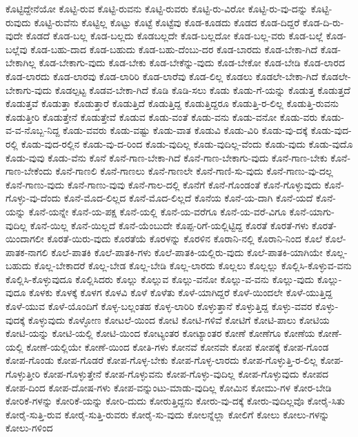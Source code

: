 {ಕೊಟ್ಟಿದ್ದೇನೆಯೋ
ಕೊಟ್ಟಿ-ರುವ
ಕೊಟ್ಟಿ-ರುವನು
ಕೊಟ್ಟಿ-ರುವರು
ಕೊಟ್ಟಿ-ರು-ವಿರೋ
ಕೊಟ್ಟಿ-ರು-ವು-ದನ್ನು
ಕೊಟ್ಟಿ-ರುವುದು
ಕೊಟ್ಟಿ-ರುವೆನು
ಕೊಟ್ಟಿಲ್ಲ
ಕೊಟ್ಟು
ಕೊಟ್ಟೆ
ಕೊಟ್ಟೆವು
ಕೊಡ-ಕೂಡದು
ಕೊಡದ
ಕೊಡ-ದಿದ್ದರೆ
ಕೊಡ-ದಿ-ರು-ವುದೇ
ಕೊಡದೆ
ಕೊಡ-ಬಲ್ಲ
ಕೊಡ-ಬಲ್ಲದು
ಕೊಡಬಲ್ಲದೇ
ಕೊಡ-ಬಲ್ಲದೋ
ಕೊಡ-ಬಲ್ಲ-ವರು
ಕೊಡ-ಬಲ್ಲೆ
ಕೊಡ-ಬಲ್ಲೆವು
ಕೊಡ-ಬಹು-ದಾದ
ಕೊಡ-ಬಹುದು
ಕೊಡ-ಬಹು-ದೆಂಬು-ದರ
ಕೊಡ-ಬಾರದು
ಕೊಡ-ಬೇಕಾ-ಗಿದೆ
ಕೊಡ-ಬೇಕಾಗಿಲ್ಲ
ಕೊಡ-ಬೇಕಾಗು-ವುದು
ಕೊಡ-ಬೇಕು
ಕೊಡ-ಬೇಕೆನ್ನು-ವುದು
ಕೊಡ-ಬೇಕೋ
ಕೊಡ-ಬೇಡಿ
ಕೊಡ-ಲಾರದ
ಕೊಡ-ಲಾರದು
ಕೊಡ-ಲಾರವು
ಕೊಡ-ಲಾರಿರಿ
ಕೊಡ-ಲಾರೆವು
ಕೊಡ-ಲಿಲ್ಲ
ಕೊಡಲು
ಕೊಡಲೇ-ಬೇಕಾ-ಗಿದೆ
ಕೊಡಲೇ-ಬೇಕಾಗು-ವುದು
ಕೊಡಲ್ಪಟ್ಟ
ಕೊಡವ-ಬೇಕಾ-ಗಿದೆ
ಕೊಡಿ
ಕೊಡಿ-ಸಲು
ಕೊಡು
ಕೊಡು-ಗೆ-ಯನ್ನು
ಕೊಡುತ್ತ
ಕೊಡುತ್ತದೆ
ಕೊಡುತ್ತವೆ
ಕೊಡುತ್ತಾ
ಕೊಡುತ್ತಾರೆ
ಕೊಡುತ್ತಿದೆ
ಕೊಡುತ್ತಿದ್ದ
ಕೊಡುತ್ತಿದ್ದರೂ
ಕೊಡುತ್ತಿ-ರ-ಲಿಲ್ಲ
ಕೊಡುತ್ತಿ-ರುವನು
ಕೊಡುತ್ತೀರಿ
ಕೊಡುತ್ತೇನೆ
ಕೊಡುತ್ತೇವೆ
ಕೊಡುವ
ಕೊಡು-ವಂತೆ
ಕೊಡು-ವನು
ಕೊಡು-ವನೋ
ಕೊಡು-ವರು
ಕೊಡು-ವ-ವ-ನೊಬ್ಬ-ನಿದ್ದ
ಕೊಡು-ವವರು
ಕೊಡು-ವಷ್ಟು
ಕೊಡು-ವಾತ
ಕೊಡುವಿ
ಕೊಡು-ವಿರಿ
ಕೊಡು-ವು-ದಕ್ಕೆ
ಕೊಡು-ವುದ-ರಲ್ಲಿ
ಕೊಡು-ವುದ-ರಲ್ಲಿನ
ಕೊಡು-ವು-ದ-ರಿಂದ
ಕೊಡು-ವುದಿಲ್ಲ
ಕೊಡು-ವುದಿಲ್ಲ-ವೆಂದು
ಕೊಡು-ವುದು
ಕೊಡು-ವುದೊ
ಕೊಡು-ವುವು
ಕೊಡು-ವೆನು
ಕೊನೆ
ಕೊನೆ-ಗಾಣ-ಬೇಕಾ-ಗಿದೆ
ಕೊನೆ-ಗಾಣ-ಬೇಕಾಗು-ವುದು
ಕೊನೆ-ಗಾಣ-ಬೇಕು
ಕೊನೆ-ಗಾಣ-ಬೇಕೆಂದು
ಕೊನೆ-ಗಾಣಲಿ
ಕೊನೆ-ಗಾಣಲು
ಕೊನೆ-ಗಾಣಲೇ
ಕೊನೆ-ಗಾಣಿ-ಸು-ವುದು
ಕೊನೆ-ಗಾಣು-ವು-ದಲ್ಲ
ಕೊನೆ-ಗಾಣು-ವುದು
ಕೊನೆ-ಗಾಣು-ವುವು
ಕೊನೆ-ಗಾಲ-ದಲ್ಲಿ
ಕೊನೆಗೆ
ಕೊನೆ-ಗೊಂಡಂತೆ
ಕೊನೆ-ಗೊಳ್ಳುವುದು
ಕೊನೆ-ಗೊಳ್ಳು-ವು-ದೆಂದು
ಕೊನೆ-ಮೊದ-ಲಿಲ್ಲದ
ಕೊನೆ-ಮೊದ-ಲಿಲ್ಲದೆ
ಕೊನೆಯ
ಕೊನೆ-ಯ-ದಾಗಿ
ಕೊನೆ-ಯದೆ
ಕೊನೆ-ಯನ್ನು
ಕೊನೆ-ಯನ್ನೇ
ಕೊನೆ-ಯ-ಪಕ್ಷ
ಕೊನೆ-ಯಲ್ಲಿ
ಕೊನೆ-ಯ-ವರೆಗೂ
ಕೊನೆ-ಯ-ವರೆ-ವಿಗೂ
ಕೊನೆ-ಯಾಗು-ವುದಿಲ್ಲ
ಕೊನೆ-ಯಿಲ್ಲ
ಕೊನೆ-ಯಿಲ್ಲದೆ
ಕೊನೆ-ಯೆಂಬುದೇ
ಕೊಪ್ಪ-ರಿಗೆ-ಯಲ್ಲಿಟ್ಟಿದ್ದ
ಕೊರತೆ
ಕೊರತೆ-ಗಳು
ಕೊರತೆ-ಯಿಂದಾಗಲೀ
ಕೊರತೆ-ಯಿರು-ವುದು
ಕೊರತೆಯೆ
ಕೊರಳನ್ನು
ಕೊರಳಿನ
ಕೊರಾನಿ-ನಲ್ಲಿ
ಕೊರಾನಿ-ನಿಂದ
ಕೊಲೆ
ಕೊಲೆ-ಪಾತಕ-ನಾಗಲಿ
ಕೊಲೆ-ಪಾತಕಿ
ಕೊಲೆ-ಪಾತಕಿ-ಗಳು
ಕೊಲೆ-ಪಾತಕಿ-ಯಲ್ಲಿರು-ವುದು
ಕೊಲೆ-ಪಾತಕಿ-ಯಾಗಿಯೇ
ಕೊಲ್ಲ-ಬಹುದು
ಕೊಲ್ಲ-ಬೇಕಾದರೆ
ಕೊಲ್ಲ-ಬೇಡ
ಕೊಲ್ಲ-ಬೇಡಿ
ಕೊಲ್ಲ-ಲಾರದು
ಕೊಲ್ಲಲು
ಕೊಲ್ಲಲ್ಲು
ಕೊಲ್ಲಿಸಿ-ಕೊಳ್ಳುವ-ವನು
ಕೊಲ್ಲಿಸಿ-ಕೊಳ್ಳುವುದೂ
ಕೊಲ್ಲಿಸಿದರು
ಕೊಲ್ಲು
ಕೊಲ್ಲುವ
ಕೊಲ್ಲು-ವನೋ
ಕೊಲ್ಲು-ವ-ವನು
ಕೊಲ್ಲು-ವುದು
ಕೊಲ್ಲು-ವುದೂ
ಕೊಳಕು
ಕೊಳಕ್ಕೆ
ಕೊಳಗ
ಕೊಳವಿ
ಕೊಳೆ
ಕೊಳೆತು
ಕೊಳೆ-ಯಾಗಿದ್ದರೆ
ಕೊಳೆ-ಯಿಂದಲೇ
ಕೊಳೆ-ಯುತ್ತಿದ್ದ
ಕೊಳೆ-ಯುವ
ಕೊಳೆ-ಯೊಂದಿಗೆ
ಕೊಳ್ಳ-ಬಲ್ಲಂತಹ
ಕೊಳ್ಳ-ಲಾರಿರಿ
ಕೊಳ್ಳುತ್ತಾನೆ
ಕೊಳ್ಳುತ್ತಿದ್ದ
ಕೊಳ್ಳು-ವವರ
ಕೊಳ್ಳು-ವುದಕ್ಕೆ
ಕೊಳ್ಳುವುದು
ಕೊಳ್ಳೋಣ
ಕೋಟಲೆ-ಯಿಂದ
ಕೋಟಿ
ಕೋಟಿ-ಗಳಿವೆ
ಕೋಟಿಗೆ
ಕೋಟಿ-ಪಾಲು
ಕೋಟಿಯ
ಕೋಟಿ-ಯನ್ನು
ಕೋಟಿ-ಯಲ್ಲಿ
ಕೋಟಿ-ಯಿಂದ
ಕೋಟ್ಯಂತರ
ಕೋಟ್ಯಾಂತರ
ಕೋಣೆ
ಕೋಣೆಗೂ
ಕೋಣೆಯ
ಕೋಣೆ-ಯಲ್ಲಿ
ಕೋಣೆ-ಯಲ್ಲಿಯೇ
ಕೋಣೆ-ಯಿಂದ
ಕೋತಿ-ಗಳು
ಕೋನವೆ
ಕೋನವೇ
ಕೋಪ
ಕೋಪಕ್ಕೆ
ಕೋಪ-ಗೊಂಡ
ಕೋಪ-ಗೊಂಡು
ಕೋಪ-ಗೊಡರೆ
ಕೋಪ-ಗೊಳ್ಳ-ಬೇಕು
ಕೋಪ-ಗೊಳ್ಳ-ಲಾರದು
ಕೋಪ-ಗೊಳ್ಳುತ್ತಿ-ರ-ಲಿಲ್ಲ
ಕೋಪ-ಗೊಳ್ಳುತ್ತೀರಿ
ಕೋಪ-ಗೊಳ್ಳುತ್ತೇನೆ
ಕೋಪ-ಗೊಳ್ಳುವನು
ಕೋಪ-ಗೊಳ್ಳು-ವುದಿಲ್ಲ
ಕೋಪ-ಗೊಳ್ಳುವುದು
ಕೋಪದ
ಕೋಪ-ದಿಂದ
ಕೋಪ-ದೋಷ-ಗಳು
ಕೋಪ-ವನ್ನುಂಟು-ಮಾಡು-ವುದಿಲ್ಲ
ಕೋಮಿನ
ಕೋಮು-ಗಳ
ಕೋರ-ಬೇಡಿ
ಕೋರಿಕೆ-ಗಳನ್ನು
ಕೋರಿಕೆ-ಯನ್ನು
ಕೋರಿ-ದುದು
ಕೋರುತ್ತಿದ್ದನು
ಕೋರು-ವು-ದಕ್ಕೆ
ಕೋರು-ವುದಿಲ್ಲವೊ
ಕೋರೈ-ಸಿತು
ಕೋರೈ-ಸುತ್ತಿ-ರುವ
ಕೋರೈ-ಸುತ್ತಿ-ರುವರು
ಕೋರೈ-ಸು-ವುದು
ಕೋಲನ್ನೆಲ್ಲಾ
ಕೋಲಿಗೆ
ಕೋಲು
ಕೋಲು-ಗಳನ್ನು
ಕೋಲು-ಗಳಿಂದ
}
